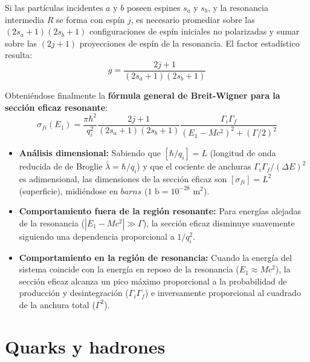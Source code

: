 Si las partículas incidentes $a$ y $b$ poseen espines $s_a$ y $s_b$, y la resonancia intermedia $R$ se forma con espín $j$, es necesario promediar sobre las $(2s_a+1)(2s_b+1)$ configuraciones de espín iniciales no polarizadas y sumar sobre las $(2j+1)$ proyecciones de espín de la resonancia. El factor estadístico resulta:
\begin{equation}
g = \frac{2j + 1}{(2s_a + 1)(2s_b + 1)}
\end{equation}

Obteniéndose finalmente la \textbf{fórmula general de Breit-Wigner para la sección eficaz resonante}:
\begin{equation}
\label{eq:breit_wigner_sigma}
\sigma_{fi}(E_1) = \frac{\pi \hbar^2}{q_i^2} \frac{2j + 1}{(2s_a + 1)(2s_b + 1)} \frac{\Gamma_i \Gamma_f}{(E_1 - M c^2)^2 + (\Gamma / 2)^2}
\end{equation}

\begin{concepto}
\begin{itemize}
    \item \textbf{Análisis dimensional:} Sabiendo que $[\hbar / q_i] = L$ (longitud de onda reducida de de Broglie $\bar{\lambda} = \hbar / q_i$) y que el cociente de anchuras $\Gamma_i \Gamma_f / (\Delta E)^2$ es adimensional, las dimensiones de la sección eficaz son $[\sigma_{fi}] = L^2$ (superficie), midiéndose en $barns$ ($1\text{ b} = 10^{-28}\text{ m}^2$).
    \item \textbf{Comportamiento fuera de la región resonante:} Para energías alejadas de la resonancia ($|E_1 - M c^2| \gg \Gamma$), la sección eficaz disminuye suavemente siguiendo una dependencia proporcional a $1/q_i^2$.
    \item \textbf{Comportamiento en la región de resonancia:} Cuando la energía del sistema coincide con la energía en reposo de la resonancia ($E_1 \approx M c^2$), la sección eficaz alcanza un pico máximo proporcional a la probabilidad de producción y desintegración ($\Gamma_i \Gamma_f$) e inversamente proporcional al cuadrado de la anchura total ($\Gamma^2$).
\end{itemize}
\end{concepto}

\newpage
\section{Quarks y hadrones}


